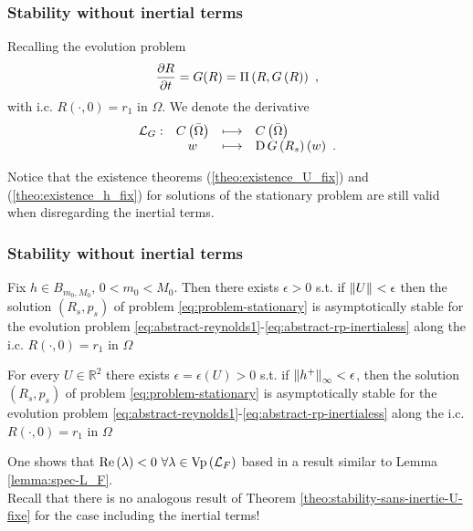 \documentclass[10pt,aspectratio=169]{beamer}
\begin{document}
\begin{frame}\frametitle{Stability without inertial terms}
Recalling the evolution problem
\begin{equation}
\frac{\partial R}{\partial t}=G(R)=\Pi\left(R,G\left(R\right)\right)~,
\end{equation}
with i.c. $R\left(\cdot,0\right)=r_1$ in $\Omega$. We denote the derivative
\begin{equation}
\begin{array}{cccl}
\mathcal{L}_G:&C\left(\bar{\Omega}\right)&\longmapsto& C\left(\bar{\Omega}\right)\\
&w& \longmapsto & \textnormal{D}\,G\left(R_s\right)\left(w\right)~.\label{eq:def-L_G}
\end{array}
\end{equation} 
\bigskip

Notice that the existence theorems (\ref{theo:existence_U_fix}) and (\ref{theo:existence_h_fix}) for solutions of the stationary problem are still valid when disregarding the inertial terms.
\end{frame}


\begin{frame}\frametitle{Stability without inertial terms}
\begin{theorem} \label{theo:stability-sans-inertie-h-fix}
	Fix $h\in B_{m_0,M_0}$, $0<m_0<M_0$. Then there exists $\epsilon>0$ s.t. if $\left\lVert U\right\rVert_{}<\epsilon$ then the solution $\left(R_s,p_s\right)$ of problem \eqref{eq:problem-stationary} is asymptotically stable for the evolution problem \eqref{eq:abstract-reynolds1}-\eqref{eq:abstract-rp-inertialess} along the i.c. $R\left(\cdot,0\right)=r_1$ in $\Omega$
\end{theorem}
\begin{theorem}\label{theo:stability-sans-inertie-U-fixe} For every $U\in \mathbb{R}^2$ there exists $\epsilon=\epsilon\left(U\right)>0$ s.t. if $\left\lVert h^+\right\rVert_{\infty}<\epsilon$, then the solution $\left(R_s,p_s\right)$ of problem \eqref{eq:problem-stationary} is asymptotically stable for the evolution problem \eqref{eq:abstract-reynolds1}-\eqref{eq:abstract-rp-inertialess} along the i.c. $R\left(\cdot,0\right)=r_1$ in $\Omega$
\end{theorem}\bigskip

One shows that $\mbox{Re}\left(\lambda\right)<0~\forall \lambda\in \textnormal{Vp}\left(\mathcal{L}_F\right)$ based in a result similar to Lemma \ref{lemma:spec-L_F}.\\
\bigskip
Recall that there is no analogous result of Theorem \ref{theo:stability-sans-inertie-U-fixe} for the case including the inertial terms!
\end{frame}
\end{document}
